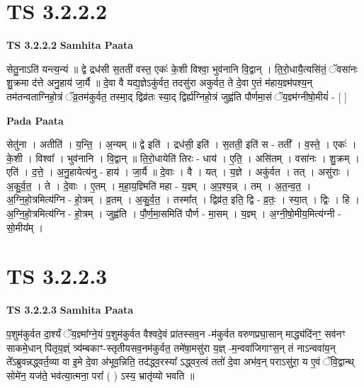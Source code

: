 \documentclass[17pt]{extarticle}
\begin{document}
\section*{ TS 3.2.2.2 }

\textbf{TS 3.2.2.2 } \newline
\textbf{Samhita Paata} \newline

सेतु॒नाऽति॑ यन्त्य॒न्यं ॥ द्वे द्रध॑सी स॒तती॑ वस्त॒ एकः॑ के॒शी विश्वा॒ भुव॑नानि वि॒द्वान् । ति॒रो॒धायै॒त्यसि॑तं॒ ॅवसा॑नः शु॒क्रमा द॑त्ते अनु॒हाय॑ जा॒र्यै ॥ दे॒वा वै यद्य॒ज्ञेऽकु॑र्वत॒ तदसु॑रा अकुर्वत॒ ते दे॒वा ए॒तं म॑हाय॒ज्ञ्म॑पश्य॒न् तम॑तन्वताग्निहो॒त्रं ॅव्र॒तम॑कुर्वत॒ तस्मा॒द् द्विव्र॑तः स्या॒द् द्विर्ह्य॑ग्निहो॒त्रं जुह्व॑ति पौर्णमा॒सं ॅय॒ज्ञ्म॑ग्नीषो॒मीयं॑ - [  ] \newline

\textbf{Pada Paata} \newline

सेतु॑ना । अतीति॑ । य॒न्ति॒ । अ॒न्यम् ॥ द्वे इति॑ । द्रध॑सी॒ इति॑ । स॒तती॒ इति॑ स - तती᳚ । व॒स्ते॒ । एकः॑ । के॒शी । विश्वा᳚ । भुव॑नानि । वि॒द्वान् ॥ ति॒रो॒धायेति॑ तिरः - धाय॑ । ए॒ति॒ । असि॑तम् । वसा॑नः । शु॒क्रम् । एति॑ । द॒त्ते॒ । अ॒नु॒हायेत्य॑नु - हाय॑ । जा॒र्यै ॥ दे॒वाः । वै । यत् । य॒ज्ञे । अकु॑र्वत । तत् । असु॑राः । अ॒कु॒र्व॒त॒ । ते । दे॒वाः । ए॒तम् । म॒हा॒य॒ज्ञ्मिति॑ महा - य॒ज्ञ्म् । अ॒प॒श्य॒न्न् । तम् । अ॒त॒न्व॒त॒ । अ॒ग्नि॒हो॒त्रमित्य॑ग्नि - हो॒त्रम् । व्र॒तम् । अ॒कु॒र्व॒त॒ । तस्मा᳚त् । द्विव्र॑त॒ इति॒ द्वि - व्र॒तः॒ । स्या॒त् । द्विः । हि । अ॒ग्नि॒हो॒त्रमित्य॑ग्नि - हो॒त्रम् । जुह्व॑ति । पौ॒र्ण॒मा॒समिति॑ पौर्ण - मा॒सम् । य॒ज्ञ्म् । अ॒ग्नी॒षो॒मीय॒मित्य॑ग्नी - सो॒मीय᳚म् ।  \newline




\section*{ TS 3.2.2.3 }

\textbf{TS 3.2.2.3 } \newline
\textbf{Samhita Paata} \newline

प॒शुम॑कुर्वत दा॒र्श्यं ॅय॒ज्ञ्मा᳚ग्ने॒यं प॒शुम॑कुर्वत वैश्वदे॒वं प्रा॑तस्सव॒न -म॑कुर्वत वरुणप्रघा॒सान् माद्ध्य॑दिंनꣳ॒॒ सव॑नꣳ साकमे॒धान् पि॑तृय॒ज्ञ्ं त्र्य॑म्बकाꣳ-स्तृतीयसव॒नम॑कुर्वत॒ तमे॑षा॒मसु॑रा य॒ज्ञ् -म॒न्ववा॑जिगाꣳस॒न् तं नाऽन्ववा॑य॒न् ते᳚ऽब्रुवन्नद्ध्वर्त॒व्या वा इ॒मे दे॒वा अ॑भूव॒न्निति॒ तद॑द्ध्व॒रस्या᳚ ऽद्ध्वर॒त्वं ततो॑ दे॒वा अभ॑व॒न् पराऽसु॑रा॒ य ए॒वं ॅवि॒द्वान्थ् सोमे॑न॒ यज॑ते॒ भव॑त्या॒त्मना॒ परा᳚ ( ) ऽस्य॒ भ्रातृ॑व्यो भवति ॥ \newline
\end{document}
